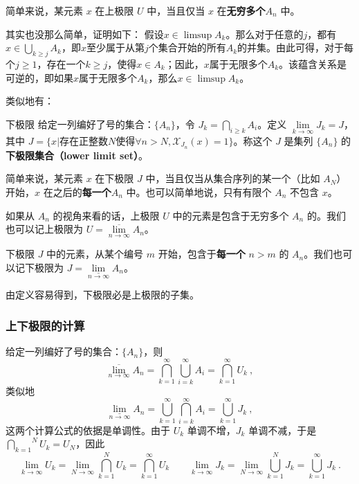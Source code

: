 简单来说，某元素 $x$ 在上极限 $U$ 中，当且仅当 $x$ 在\textbf{无穷多个}$A_n$ 中。

\begin{corollary}{其实也没那么简单，证明如下：}
假设$x\in\limsup A_{k}$。那么对于任意的$j$，都有$x\in\bigcup_{k\geqslant j}A_{k}$，即$x$至少属于从第$j$个集合开始的所有$A_{k}$的并集。由此可得，对于每个$j\geq1$，存在一个$k\geq j$，使得$x\in A_{k}$；因此，$x$属于无限多个$A_{k}$。该蕴含关系是可逆的，即如果$x$属于无限多个$A_{k}$，那么$x\in\limsup A_{k}$。
\end{corollary}

类似地有：

\begin{definition}{下极限}
给定一列编好了号的集合：$\{A_n\}$，令 $J_k=\underset{i\ge k}{\bigcap} A_i$。定义 $\lim\limits_{k\to\infty} J_k=J$，其中 $J=\{x|\text{存在正整数}N\text{使得}\forall n>N, \mathcal{X}_{J_n}(x)=1\}$。称这个 $J$ 是集列 $\{A_n\}$ 的\textbf{下极限集合（lower limit set）}。
\end{definition}

简单来说，某元素 $x$ 在下极限 $J$ 中，当且仅当从集合序列的某一个（比如 $A_N$）开始，$x$ 在之后的\textbf{每一个}$A_n$ 中。也可以简单地说，只有有限个 $A_n$ 不包含 $x$。

如果从 $A_n$ 的视角来看的话，上极限 $U$ 中的元素是包含于无穷多个 $A_n$ 的。我们也可以记上极限为 $U=\underset{n\to \infty}{\overline{\lim}} A_n$。

下极限 $J$ 中的元素，从某个编号 $m$ 开始，包含于\textbf{每一个} $n>m$ 的 $A_n$。我们也可以记下极限为 $J=\underset{n\to \infty}{\underline{\lim}}A_n$。

由定义容易得到，下极限必是上极限的子集。

\subsubsection{上下极限的计算}
给定一列编好了号的集合：$\{A_n\}$，则
\begin{equation}
\underset{n\to \infty}{\overline{\lim}} A_n = \overset {\infty}{\underset{k=1}{\bigcap}} \overset{\infty}{\underset{i=k}{\bigcup}} A_i = \overset{\infty}{\underset{k=1}{\bigcap}} U_k~,
\end{equation}
类似地
\begin{equation}
\underset{n\to \infty}{\underline{\lim}}A_n=\overset{\infty}{\underset{k=1}{\bigcup}}\overset{\infty}{\underset{i=k}{\bigcap}} A_i=\overset{\infty} {\underset{k=1}{\bigcup}} J_k~,
\end{equation}
这两个计算公式的依据是单调性。由于 $U_k$ 单调不增，$J_k$ 单调不减，于是 $\displaystyle \overset{N}{\underset{k=1}{\bigcap}}U_k=U_N$，因此
\begin{equation}
\lim_{k\to\infty}U_k=\lim\limits_{N\to\infty}\overset{N}{\underset{k=1}{\bigcap}} U_k=\overset{\infty}{\underset{k=1}{\bigcap}}U_k
\qquad
\lim\limits_{k\to\infty}J_k=\lim\limits_{N\to\infty}\overset{N}{\underset{k=1}{\bigcup}} J_k=\overset{\infty}{\underset{k=1}{\bigcup}} J_k~.
\end{equation}

